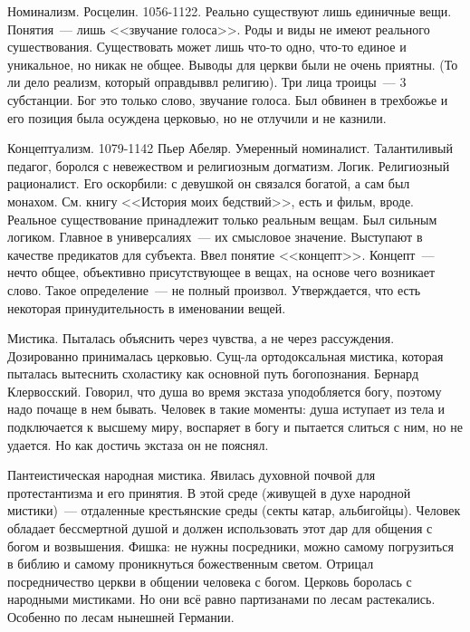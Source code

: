 Номинализм.
Росцелин. 1056-1122. Реально существуют лишь единичные вещи. Понятия~--- лишь <<звучание голоса>>. Роды и виды не имеют реального сушествования. Существовать может лишь что-то одно, что-то единое и уникальное, но никак не общее. Выводы для церкви были не очень приятны. (То ли дело реализм, который оправдыввл религию). Три лица троицы~--- 3 субстанции. Бог это только слово, звучание голоса. Был обвинен в трехбожье и его позиция была осуждена церковью, но не отлучили и не казнили.

Концептуализм. 1079-1142 Пьер Абеляр. Умеренный номиналист. Талантиливый педагог, боролся с невежеством и религиозным догматизм. Логик. Религиозный рационалист. Его оскорбили: с девушкой он связался богатой, а сам был монахом. См. книгу <<История моих бедствий>>, есть и фильм, вроде. Реальное существование принадлежит только реальным вещам. Был сильным логиком. Главное в универсалиях~--- их смысловое значение. Выступают в качестве предикатов для субъекта. Ввел понятие <<концепт>>. Концепт~--- нечто общее, объективно присутствующее в вещах, на основе чего возникает слово. Такое определение~--- не полный произвол. Утверждается, что есть некоторая принудительность в именовании вещей.

Мистика. Пыталась объяснить через чувства, а не через рассуждения. Дозированно принималась церковью. Сущ-ла ортодоксальная мистика, которая пыталась вытеснить схоластику как основной путь богопознания. Бернард Клервосский. Говорил, что душа во время экстаза уподобляется богу, поэтому надо почаще в нем бывать. Человек в такие моменты: душа иступает из тела и подключается к высшему миру, воспаряет в богу и пытается слиться с ним, но не удается. Но как достичь экстаза он не пояснял.

Пантеистическая народная мистика. Явилась духовной почвой для протестантизма и его принятия. В этой среде (живущей в духе народной мистики)~--- отдаленные крестьянские среды (секты катар, альбигойцы). Человек обладает бессмертной душой и должен использовать этот дар для общения с богом и возвышения. Фишка: не нужны посредники, можно самому погрузиться в библию и самому проникнуться божественным светом. Отрицал посредничество церкви в общении человека с богом. Церковь боролась с народными мистиками. Но они всё равно партизанами по лесам растекались. Особенно по лесам нынешней Германии.

